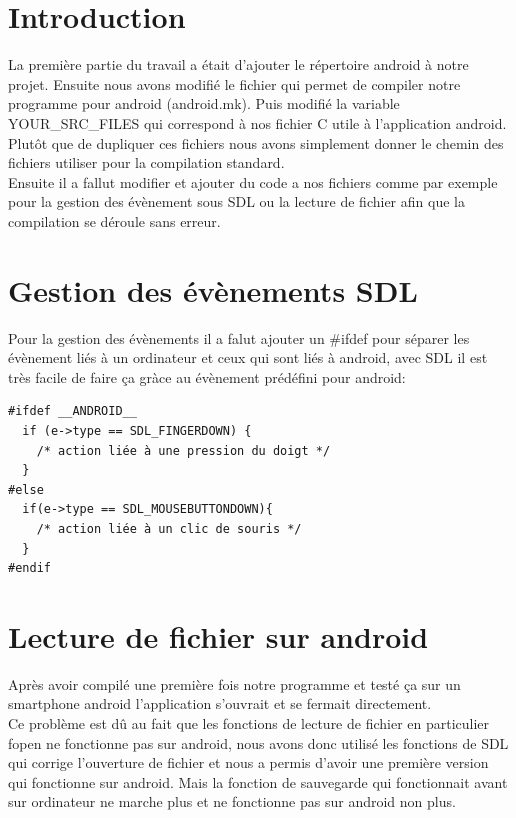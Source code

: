 \documentclass[12pt]{report}
\begin{document}
\section{Introduction}
\textnormal{La première partie du travail a était d'ajouter le répertoire android à notre projet. Ensuite nous avons modifié le fichier qui permet de compiler notre programme pour android (android.mk). Puis modifié la variable YOUR\_SRC\_FILES qui correspond à nos fichier C utile à l'application android. Plutôt que de dupliquer ces fichiers nous avons simplement donner le chemin des fichiers utiliser pour la compilation standard.\\Ensuite il a fallut modifier et ajouter du code a nos fichiers comme par exemple pour la gestion des évènement sous SDL ou la lecture de fichier afin que la compilation se déroule sans erreur.}
\section{Gestion des évènements SDL}
\textnormal{Pour la gestion des évènements il a falut ajouter un \#ifdef pour séparer les évènement liés à un ordinateur et ceux qui sont liés à android, avec SDL il est très facile de faire ça gràce au évènement prédéfini pour android:}
\begin{verbatim}
#ifdef __ANDROID__
  if (e->type == SDL_FINGERDOWN) {
    /* action liée à une pression du doigt */
  }
#else
  if(e->type == SDL_MOUSEBUTTONDOWN){
    /* action liée à un clic de souris */
  }
#endif
\end{verbatim}
\section{Lecture de fichier sur android}
\textnormal{Après avoir compilé une première fois notre programme et testé ça sur un smartphone android l'application s'ouvrait et se fermait directement.\\Ce problème est dû au fait que les fonctions de lecture de fichier en particulier fopen ne fonctionne pas sur android, nous avons donc utilisé les fonctions de SDL qui corrige l'ouverture de fichier et nous a permis d'avoir une première version qui fonctionne sur android. Mais la fonction de sauvegarde qui fonctionnait avant sur ordinateur ne marche plus et ne fonctionne pas sur android non plus.}
\end{document}
